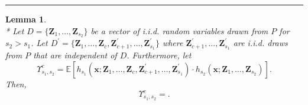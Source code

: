 \documentclass[letterpaper,10pt]{article}
\numberwithin{equation}{section}
\numberwithin{thm}{section}
\newtheorem{lem}{Lemma}
\numberwithin{lem}{section}
\numberwithin{cor}{section}
\newcommand{\E}{\mathbb{E}}
\newcommand{\1}{\mathbbm{1}}
\begin{document}
\hrule

\begin{lem}\label{lem_upsilon_sc}\mbox{}\\*
	Let $D = \{\mathbf{Z}_1, \dotsc, \mathbf{Z}_{s_2}\}$ be a vector of i.i.d. random variables drawn from $P$ for $s_2 > s_1$.
	Let $D^{\prime} = \{\mathbf{Z}_1, \dotsc, \mathbf{Z}_{c}, \mathbf{Z}_{c+1}^{\prime}, \dotsc,  \mathbf{Z}_{s_1}^{\prime}\}$ where $\mathbf{Z}_{c+1}^{\prime}, \dotsc,  \mathbf{Z}_{s_1}^{\prime}$ are i.i.d. draws from $P$ that are independent of $D$.
	Furthermore, let
	\begin{equation}
		\Upsilon_{s_1, s_2}^{c}
		= \E\left[h_{s_1}\left(\mathbf{x}; \mathbf{Z}_1, \ldots, \mathbf{Z}_c, \mathbf{Z}^{\prime}_{c+1}, \ldots,  \mathbf{Z}^{\prime}_{s_1}\right) \cdot
			h_{s_2}\left(\mathbf{x}; \mathbf{Z}_1, \ldots, \mathbf{Z}_{s_2}\right)\right].
	\end{equation}
	Then,
	\begin{equation}
		\Upsilon_{s_1, s_2}^{c}
		= .
	\end{equation}
\end{lem}
\end{document}
